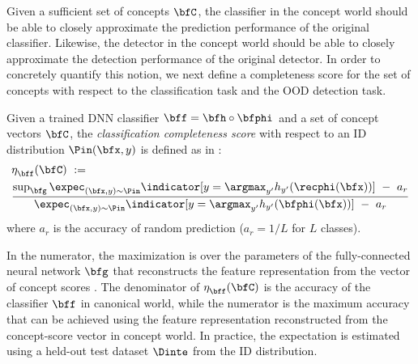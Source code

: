 

Given a sufficient set of concepts $\bfC$, the classifier in the concept world should be able to closely approximate the prediction performance of the original classifier.
Likewise, the detector in the concept world should be able to closely approximate the detection performance of the original detector.
In order to concretely quantify this notion, we next define a 
completeness score for the set of concepts with respect to the classification task and the OOD detection task.

\begin{definition}
\label{def:completeness_class}
Given a trained DNN classifier $\bff = \bfh \circ \bfphi\,$ and a set of concept vectors $\bfC$, the {\em classification completeness score} with respect to an ID distribution $\Pin(\bfx, y)$ is defined as in \cite{yeh2019completeness}:
\begin{align}
\label{equ: completeness-classification}
    &\eta^{}_\bff(\bfC) ~:= \\ 
    &\frac{\textrm{sup}_\bfg \,\expec_{(\bfx, y) \sim \Pin} \indicator[ y = \argmax_{y'} h_{y'}(\recphi(\bfx)) ] ~-~ a_r}{\expec_{(\bfx, y) \sim \Pin} \indicator[y = \argmax_{y'} h_{y'}(\bfphi(\bfx))] ~-~ a_r} \nonumber
\end{align}
where $a_r$ is the accuracy of random prediction (\ie $a_r = 1/L$ for $L$ classes).
\end{definition}
In the numerator, the maximization is over the parameters of the fully-connected neural network $\bfg$ that reconstructs the feature representation from the vector of concept scores .
The denominator of $\eta^{}_\bff(\bfC)$ is the accuracy of the classifier $\bff$ in canonical world, while the numerator is the maximum accuracy that can be achieved using the feature representation reconstructed from the concept-score vector in concept world.
In practice, the expectation is estimated using a held-out test dataset $\Dinte$ from the ID distribution.


